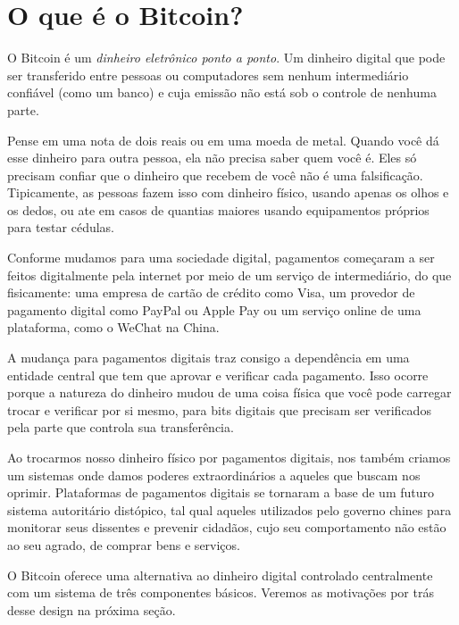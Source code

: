 \chapter{O que é o Bitcoin?}
\label{ch:capitulo1}

O Bitcoin é um \textit{dinheiro eletrônico ponto a ponto}. Um dinheiro digital que pode ser transferido entre pessoas ou computadores sem nenhum intermediário confiável (como um banco) e cuja emissão não está sob o controle de nenhuma parte.

Pense em uma nota de dois reais ou em uma moeda de metal. Quando você dá esse dinheiro para outra pessoa, ela não precisa saber quem você é. Eles só precisam confiar que o dinheiro que recebem de você não é uma falsificação. Tipicamente, as pessoas fazem isso com dinheiro físico, usando apenas os olhos e os dedos, ou ate em casos de quantias maiores usando equipamentos próprios para testar cédulas.

Conforme mudamos para uma sociedade digital, pagamentos começaram a ser feitos digitalmente pela internet por meio de um serviço de intermediário, do que fisicamente: uma empresa de cartão de crédito como Visa, um provedor de pagamento digital como PayPal ou Apple Pay ou um serviço online de uma plataforma, como o WeChat na China.

A mudança para pagamentos digitais traz consigo a dependência em uma entidade central que tem que aprovar e verificar cada pagamento. Isso ocorre porque a natureza do dinheiro mudou de uma coisa física que você pode carregar trocar e verificar por si mesmo, para bits digitais que precisam ser verificados pela parte que controla sua transferência.


Ao trocarmos nosso dinheiro físico por pagamentos digitais, nos também criamos um sistemas onde damos poderes extraordinários a aqueles que buscam nos oprimir.
Plataformas de pagamentos digitais se tornaram a base de um futuro sistema autoritário distópico, tal qual aqueles utilizados pelo governo chines para monitorar seus dissentes e prevenir cidadãos, cujo seu comportamento não estão ao seu agrado, de comprar bens e serviços.

O Bitcoin oferece uma alternativa ao dinheiro digital controlado centralmente com um sistema de três componentes básicos. Veremos as motivações por trás desse design na próxima seção.

